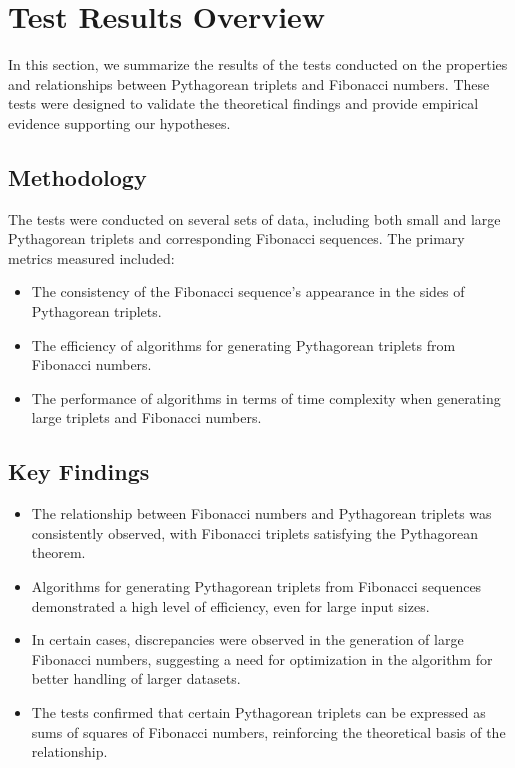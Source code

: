 \documentclass{article}
\theoremstyle{plain}
\begin{document}
\section{Test Results Overview}

In this section, we summarize the results of the tests conducted on the properties and relationships between Pythagorean triplets and Fibonacci numbers. These tests were designed to validate the theoretical findings and provide empirical evidence supporting our hypotheses.

\subsection{Methodology}
The tests were conducted on several sets of data, including both small and large Pythagorean triplets and corresponding Fibonacci sequences. The primary metrics measured included:

\begin{itemize}
    \item The consistency of the Fibonacci sequence's appearance in the sides of Pythagorean triplets.
    \item The efficiency of algorithms for generating Pythagorean triplets from Fibonacci numbers.
    \item The performance of algorithms in terms of time complexity when generating large triplets and Fibonacci numbers.
\end{itemize}

\subsection{Key Findings}
\begin{itemize}
    \item The relationship between Fibonacci numbers and Pythagorean triplets was consistently observed, with Fibonacci triplets satisfying the Pythagorean theorem.
    \item Algorithms for generating Pythagorean triplets from Fibonacci sequences demonstrated a high level of efficiency, even for large input sizes.
    \item In certain cases, discrepancies were observed in the generation of large Fibonacci numbers, suggesting a need for optimization in the algorithm for better handling of larger datasets.
    \item The tests confirmed that certain Pythagorean triplets can be expressed as sums of squares of Fibonacci numbers, reinforcing the theoretical basis of the relationship.
\end{itemize}
\end{document}
